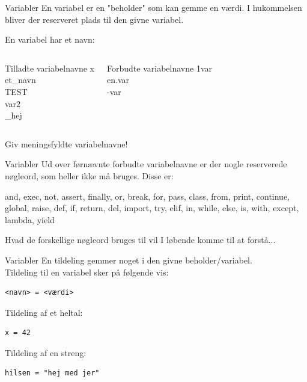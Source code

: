 \documentclass{beamer}
\begin{document}
\begin{frame}{Variabler}
En variabel er en "beholder" som kan gemme en værdi. I hukommelsen bliver der reserveret plads til den givne variabel.


En variabel har et navn:
\begin{columns}
\begin{exampleblock}{Tilladte variabelnavne}
x\\et\_navn\\TEST\\var2\\\_hej
\end{exampleblock}

\begin{alertblock}{Forbudte variabelnavne}
1var\\en.var\\-var
\end{alertblock}
\end{columns}
\vfill
Giv meningsfyldte variabelnavne!
\end{frame}

\begin{frame}{Variabler}
Ud over førnævnte forbudte variabelnavne er der nogle reserverede nøgleord, som heller ikke må bruges.
\vfill
Disse er: \\
\begin{Large}
and, exec, not, assert,	finally, or, break, for, pass, class, from, print, continue, global, raise, def, if, return, del, import, try, elif, in, while, else, is, with, except, lambda,	yield		
\end{Large}
\vfill
Hvad de forskellige nøgleord bruges til vil I løbende komme til at forstå...
\end{frame}

\begin{frame}[fragile]{Variabler}
En tildeling gemmer noget i den givne beholder/variabel.\\
Tildeling til en variabel sker på følgende vis:
\begin{lstlisting}[style=python]
<navn> = <værdi>
\end{lstlisting}
Tildeling af et heltal:
\begin{lstlisting}[style=python]
x = 42
\end{lstlisting}
Tildeling af en streng:
\begin{lstlisting}[style=python]
hilsen = "hej med jer"
\end{lstlisting}
\end{frame}
\end{document}
